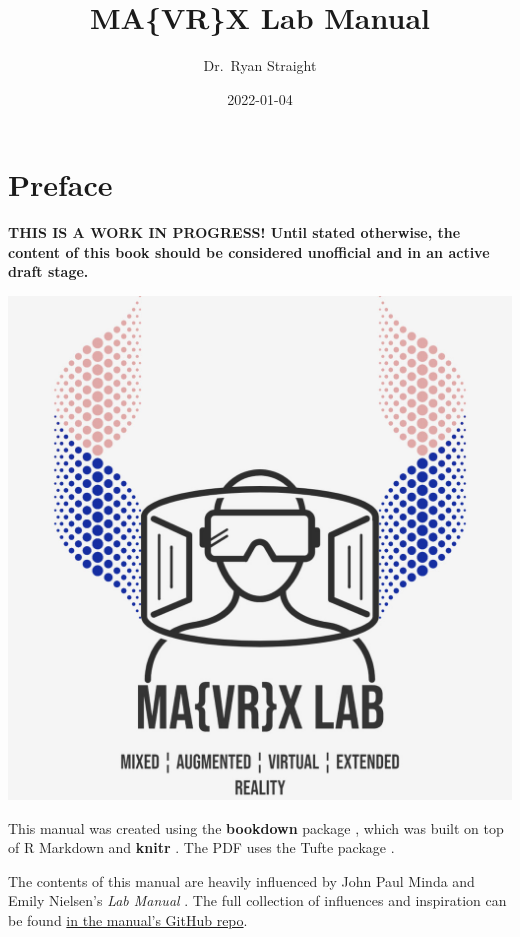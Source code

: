 \documentclass[]{tufte-book}
\title{MA\{VR\}X Lab Manual}
\author{Dr.~Ryan Straight}
\date{2022-01-04}
\begin{document}
\maketitle



{
\hypersetup{linkcolor=black}
\setcounter{tocdepth}{1}
\tableofcontents
}
\listoftables
\listoffigures

\hypertarget{preface}{%
\chapter*{Preface}\label{preface}}

\textbf{THIS IS A WORK IN PROGRESS! Until stated otherwise, the content of this book should be considered unofficial and in an active draft stage.}

\begin{center}\href{https://mavrxlab.org}{\includegraphics{images/square-solid} }\end{center}

This manual was created using the \textbf{bookdown} package \citep{R-bookdown}, which was built on top of R Markdown and \textbf{knitr} \citep{xie2015}. The PDF uses the Tufte package \citep{xieTufteTufteStyles2021}.

The contents of this manual are heavily influenced by John Paul Minda and Emily Nielsen's \emph{Lab Manual} \citeyearpar{Minda_Nielsen_2018}. The full collection of influences and inspiration can be found \href{https://github.com/mavrxlab/lab-manual}{in the manual's GitHub repo}.
\end{document}
